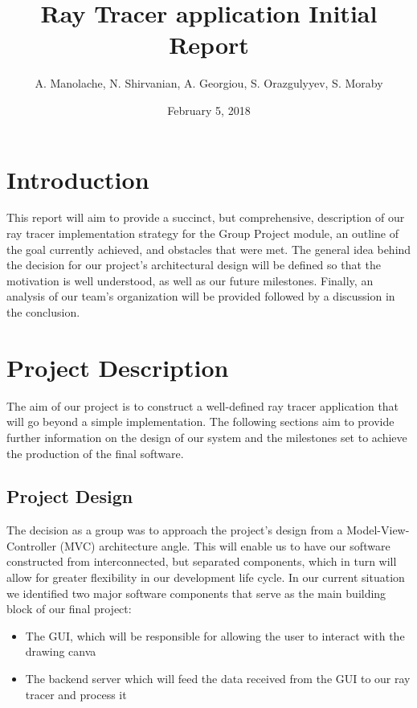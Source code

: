 \documentclass[11pt,a4paper]{article}
\title{Ray Tracer application Initial Report}
\author{A. Manolache, N. Shirvanian, A. Georgiou, S. Orazgulyyev, S. Moraby}
\date{February 5, 2018}
\begin{document}
\maketitle

\section{Introduction}

This report will aim to provide a succinct, but comprehensive, description of our ray tracer implementation strategy for the Group Project module, an outline of the goal currently achieved, and obstacles that were met. The general idea behind the decision for our project's architectural design will be defined so that the motivation is well understood, as well as our future milestones. Finally, an analysis of our team's organization will be provided followed by a discussion in the conclusion.

\section{Project Description}

The aim of our project is to construct a well-defined ray tracer application that will go beyond a simple implementation. The following sections aim to provide further information on the design of our system and the milestones set to achieve the production of the final software. 

\subsection{Project Design}

The decision as a group was to approach the project's design from a Model-View-Controller (MVC) architecture angle. This will enable us to have our software constructed from interconnected, but separated components, which in turn will allow for greater flexibility in our development life cycle. In our current situation we identified two major software components that serve as the main building block of our final project:

\begin{itemize}[nosep, wide=20pt, leftmargin=*, after=\strut]
    \item The GUI, which will be responsible for allowing the user to interact with the drawing canva
    \item The backend server which will feed the data received from the GUI to our ray tracer and process it
\end{itemize}
\end{document}
